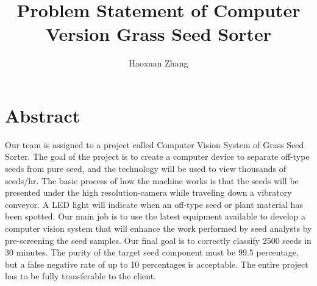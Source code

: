 \documentclass[letter,draftclsnoffot, onecolumn]{IEEEtran}
\title{Problem Statement of Computer Version Grass Seed Sorter }
\author{Haoxuan Zhang }
\begin{document}
\maketitle

\section{Abstract}
Our team is assigned to a project called Computer Vision System of Grass Seed Sorter. The goal of the project is to create a computer device to separate off-type seeds from pure seed, and the technology will be used to view thousands of seeds/hr.  The basic process of how the machine works is that the seeds will be presented under the high resolution-camera while traveling down a vibratory conveyor. A LED light will indicate when an off-type seed or plant material has been spotted. Our main job is to use the latest equipment available to develop a computer vision system that will enhance the work performed by seed analysts by pre-screening the seed samples. Our final goal is to correctly classify 2500 seeds in 30 minutes. The purity of the target seed component must be 99.5 percentage, but a false negative rate of up to 10 percentages is acceptable. The entire project has to be fully transferable to the client. 
\pagebreak
\end{document}

